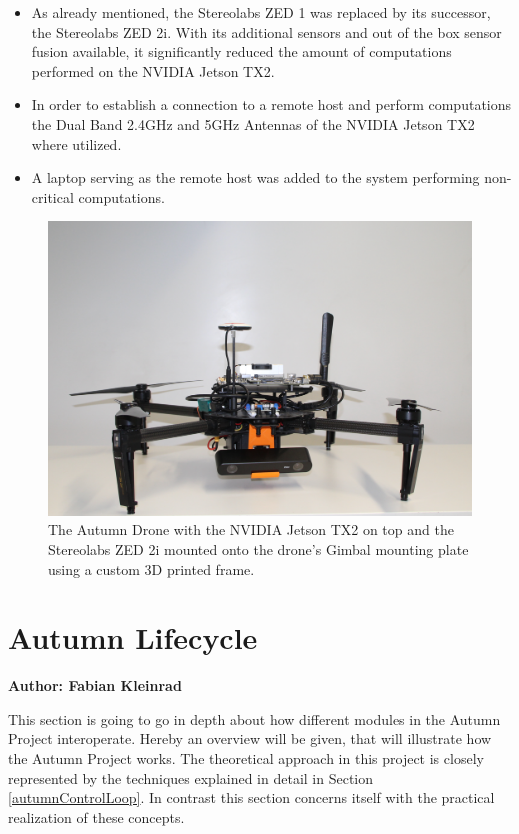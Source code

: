 \begin{itemize}
	\item As already mentioned, the Stereolabs ZED 1 was replaced by its successor, the Stereolabs ZED 2i. With its additional sensors and out of the box sensor fusion available, it significantly reduced the amount of computations performed on the NVIDIA Jetson TX2. 
	\item In order to establish a connection to a remote host and perform computations the Dual Band 2.4GHz and 5GHz Antennas of the NVIDIA Jetson TX2 where utilized. 
	\item A laptop serving as the remote host was added to the system performing non-critical computations.
\end{itemize}

\begin{figure}
	\centering
	\includegraphics[width=0.9\linewidth]{img/autumnDrone}
	\caption{
		The Autumn Drone with the NVIDIA Jetson TX2 on top and the Stereolabs ZED 2i mounted onto the drone's Gimbal mounting plate using a custom 3D printed frame. 
	}
	\label{fig:autumn}
\end{figure}


\section{Autumn Lifecycle}
\textbf{Author: Fabian Kleinrad} 

This section is going to go in depth about how different modules in the Autumn Project interoperate. Hereby an overview will be given, that will illustrate how the Autumn Project works. The theoretical approach in this project is closely represented by the techniques explained in detail in Section 
\ref{autumnControlLoop}. In contrast this section concerns itself with the practical realization of these concepts.

